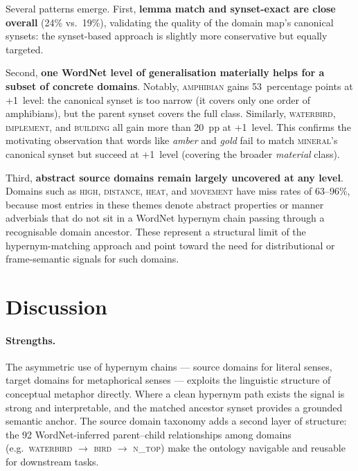 \documentclass[11pt,a4paper]{article}
\begin{document}
Several patterns emerge.
First, \textbf{lemma match and synset-exact are close overall} (24\% vs.\
19\%), validating the quality of the domain map's canonical synsets: the
synset-based approach is slightly more conservative but equally targeted.

Second, \textbf{one WordNet level of generalisation materially helps for a
subset of concrete domains}.
Notably, \textsc{amphibian} gains 53~percentage points at +1~level:
the canonical synset is too narrow (it covers only one order of
amphibians), but the parent synset covers the full class.
Similarly, \textsc{waterbird}, \textsc{implement}, and \textsc{building}
all gain more than 20~pp at +1~level.
This confirms the motivating observation that words like \emph{amber} and
\emph{gold} fail to match \textsc{mineral}'s canonical synset but succeed
at +1~level (covering the broader \emph{material} class).

Third, \textbf{abstract source domains remain largely uncovered at any
level}.
Domains such as \textsc{high}, \textsc{distance}, \textsc{heat}, and
\textsc{movement} have miss rates of 63--96\%, because most entries in
these themes denote abstract properties or manner adverbials that do not
sit in a WordNet hypernym chain passing through a recognisable domain
ancestor.
These represent a structural limit of the hypernym-matching approach and
point toward the need for distributional or frame-semantic signals for
such domains.

\section{Discussion}
\label{sec:discussion}

\paragraph{Strengths.}
The asymmetric use of hypernym chains — source domains for literal senses,
target domains for metaphorical senses — exploits the linguistic
structure of conceptual metaphor directly.
Where a clean hypernym path exists the signal is strong and interpretable,
and the matched ancestor synset provides a grounded semantic anchor.
The source domain taxonomy adds a second layer of structure: the 92
WordNet-inferred parent--child relationships among domains (e.g.\
\textsc{waterbird} $\to$ \textsc{bird} $\to$ \textsc{n\_top}) make the
ontology navigable and reusable for downstream tasks.
\end{document}
